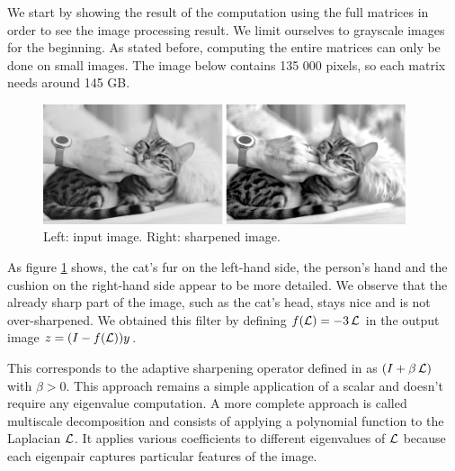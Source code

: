 We start by showing the result of the computation using the full matrices in order to see the image processing result.
We limit ourselves to grayscale images for the beginning.
As stated before, computing the entire matrices can only be done on small images.
The image below contains 135 000 pixels, so each matrix needs around 145 GB.

\begin{figure}[H]
 \centering
 \includegraphics[width=0.95\textwidth]{img/cat.png}
 \caption{Left: input image. Right: sharpened image.}
 \label{fig:entire_result}
\end{figure}

As figure \ref{fig:entire_result} shows, the cat's fur on the left-hand side, the person's hand and the cushion on the right-hand side appear to be more detailed.
We observe that the already sharp part of the image, such as the cat's head, stays nice and is not over-sharpened.
We obtained this filter by defining \(f(\operatorname{\mathcal{L}}) = -3\operatorname{\mathcal{L}}\) in the output image \(z = (I - f(\operatorname{\mathcal{L}}))y\).

This corresponds to the adaptive sharpening operator defined in \cite{siam_slides_2016} as \((I + \beta \operatorname{\mathcal{L}})\) with \(\beta > 0\).
This approach remains a simple application of a scalar and doesn't require any eigenvalue computation.
\ifthesis
 A more complete approach is called multiscale decomposition \cite{talebi_nonlocal_2014} and consists of applying a polynomial function to the Laplacian \(\operatorname{\mathcal{L}}\).
 It applies various coefficients to different eigenvalues of \(\operatorname{\mathcal{L}}\) because each eigenpair captures particular features of the image.
\fi
